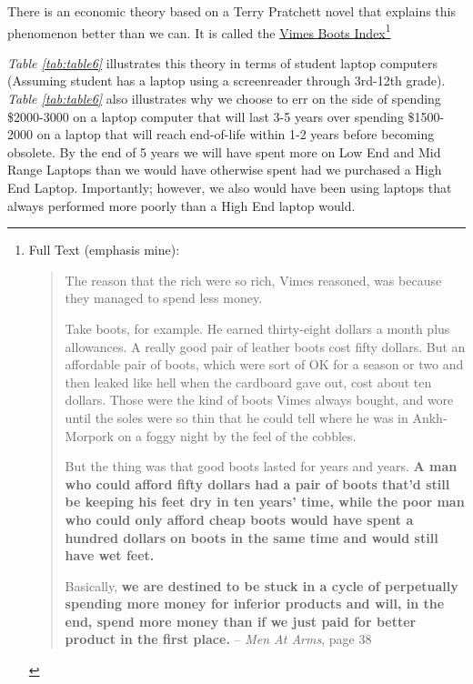  There is an economic theory based on a Terry Pratchett novel that explains this phenomenon better than we can. It is called the \href{http://en.wikipedia.org/wiki/Boots_theory}{Vimes Boots Index}\footnote{\raggedright Full Text (emphasis mine):
 \begin{leftbar}
 \begin{quote}The reason that the rich were so rich, Vimes reasoned, was because they managed to spend less money.
 
 Take boots, for example. He earned thirty-eight dollars a month plus allowances. A really good pair of leather boots cost fifty dollars. But an affordable pair of boots, which were sort of OK for a season or two and then leaked like hell when the cardboard gave out, cost about ten dollars. Those were the kind of boots Vimes always bought, and wore until the soles were so thin that he could tell where he was in Ankh-Morpork on a foggy night by the feel of the cobbles.
 
 But the thing was that good boots lasted for years and years. \textbf{A man who could afford fifty dollars had a pair of boots that’d still be keeping his feet dry in ten years’ time, while the poor man who could only afford cheap boots would have spent a hundred dollars on boots in the same time and would still have wet feet.}
 
 Basically, \textbf{we are destined to be stuck in a cycle of perpetually spending more money for inferior products and will, in the end, spend more money than if we just paid for better product in the first place.} \break \qquad-- \textit{Men At Arms}, page 38
 \end{quote}
 \end{leftbar} 
 }
 
 \hfill \break \textit{Table \ref{tab:table6}} illustrates this theory in terms of student laptop computers (Assuming student has a laptop using a screenreader through 3rd-12th grade). \textit{Table \ref{tab:table6}} also illustrates why we choose to err on the side of spending \$2000-3000 on a laptop computer that will last 3-5 years over spending \$1500-2000 on a laptop that will reach end-of-life within 1-2 years before becoming obsolete. By the end of 5 years we will have spent more on Low End and Mid Range Laptops than we would have otherwise spent had we purchased a High End Laptop. Importantly; however, we also would have been using laptops that always performed more poorly than a High End laptop would.
 
